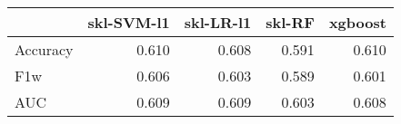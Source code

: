 \begin{tabular}{lrrrr}
\toprule
{} &  skl-SVM-l1 &  skl-LR-l1 &  skl-RF &  xgboost \\
\midrule
Accuracy &       0.610 &      0.608 &   0.591 &    0.610 \\
F1w      &       0.606 &      0.603 &   0.589 &    0.601 \\
AUC      &       0.609 &      0.609 &   0.603 &    0.608 \\
\bottomrule
\end{tabular}
